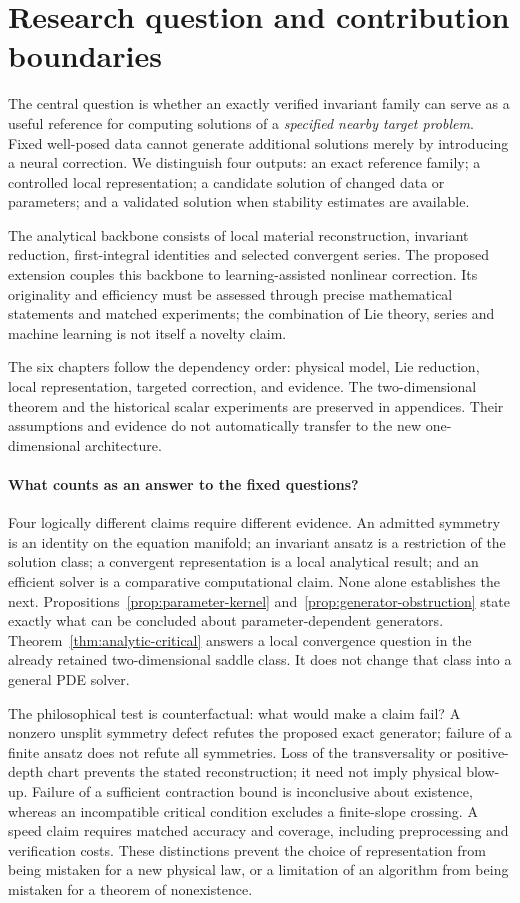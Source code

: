 \documentclass[12pt,a4paper,oneside]{report}
\numberwithin{equation}{chapter}
\theoremstyle{remark}\newtheorem{remark}[theorem]{Remark}
\begin{document}
\section{Research question and contribution boundaries}
The central question is whether an exactly verified invariant family can serve as a useful reference for computing solutions of a \emph{specified nearby target problem}. Fixed well-posed data cannot generate additional solutions merely by introducing a neural correction. We distinguish four outputs: an exact reference family; a controlled local representation; a candidate solution of changed data or parameters; and a validated solution when stability estimates are available.

The analytical backbone consists of local material reconstruction, invariant reduction, first-integral identities and selected convergent series. The proposed extension couples this backbone to learning-assisted nonlinear correction. Its originality and efficiency must be assessed through precise mathematical statements and matched experiments; the combination of Lie theory, series and machine learning is not itself a novelty claim.

The six chapters follow the dependency order: physical model, Lie reduction, local representation, targeted correction, and evidence. The two-dimensional theorem and the historical scalar experiments are preserved in appendices. Their assumptions and evidence do not automatically transfer to the new one-dimensional architecture.

\paragraph{What counts as an answer to the fixed questions?}
Four logically different claims require different evidence. An admitted
symmetry is an identity on the equation manifold; an invariant ansatz is a
restriction of the solution class; a convergent representation is a local
analytical result; and an efficient solver is a comparative computational
claim. None alone establishes the next. Propositions~\ref{prop:parameter-kernel}
and~\ref{prop:generator-obstruction} state exactly what can be concluded
about parameter-dependent generators. Theorem~\ref{thm:analytic-critical}
answers a local convergence question in the already retained two-dimensional
saddle class. It does not change that class into a general PDE solver.

The philosophical test is counterfactual: what would make a claim fail?
A nonzero unsplit symmetry defect refutes the proposed exact generator;
failure of a finite ansatz does not refute all symmetries. Loss of the
transversality or positive-depth chart prevents the stated reconstruction;
it need not imply physical blow-up. Failure of a sufficient contraction
bound is inconclusive about existence, whereas an incompatible critical
condition excludes a finite-slope crossing. A speed claim requires matched
accuracy and coverage, including preprocessing and verification costs.
These distinctions prevent the choice of representation from being
mistaken for a new physical law, or a limitation of an algorithm from
being mistaken for a theorem of nonexistence.
\end{document}
